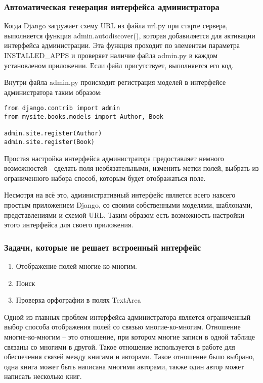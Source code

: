 \documentclass[a4paper, 12pt]{report}
\begin{document}
\subsubsection{Автоматическая генерация интерфейса администратора}

Когда Django загружает схему URL из файла url.py  при старте сервера, выполняется функция admin.autodiscover(), которая добавиляется для активации интерфейса администрации. Эта функция проходит по элементам параметра INSTALLED\_APPS и проверяет наличие файла admin.py в каждом установленом приложении. Если файл присутствует, выполняется его код. 

Внутри файла admin.py происходит регистрация моделей в интерфейсе администратора таким образом: 

\begin{verbatim}
from django.contrib import admin
from mysite.books.models import Author, Book

admin.site.register(Author)
admin.site.register(Book)
\end{verbatim}

Простая настройка интерфейса администратора предоставляет немного возможностей - сделать поля необязательными, изменить метки полей, выбрать из ограниченного набора способ, которым будет отображаться поле.

Несмотря на всё это, административный интерфейс является всего навсего простым приложением Django, со своими собственными моделями, шаблонами, представлениями и схемой URL. Таким образом есть возможность настройки этого интерфейса для своего приложения.

\subsubsection{Задачи, которые не решает встроенный интерфейс}
\begin{enumerate}
	\item Отображение полей многие-ко-многим.
	\item Поиск
	\item Проверка орфографии в полях TextArea
\end{enumerate}

Одной из главных проблем интерфейса администратора является ограниченный выбор способа отображения полей со связью многие-ко-многим. Отношение многие-ко-многим  -- это отношение, при котором многие записи в одной таблице связаны со многими в другой. Такое отношение используется в работе для обеспечения связей между книгами и авторами. Такое отношение было выбрано, \tk одна книга может быть написана многими авторами, также один автор может написать несколько книг. 
\end{document}
